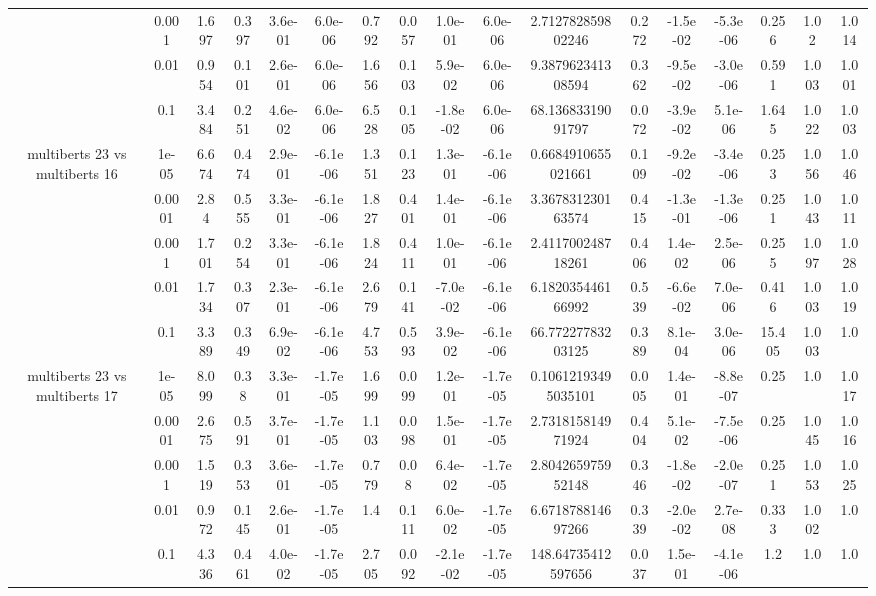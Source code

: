 \begin{tabular}{|c|c|c|c|c|c|c|c|c|c|c|c|c|c|c|c|c|}
 & 0.001 & 1.697 & 0.397 & 3.6e-01 & 6.0e-06 & 0.792 & 0.057 & 1.0e-01 & 6.0e-06 & 2.712782859802246 & 0.272 & -1.5e-02 & -5.3e-06 & 0.256 & 1.02 & 1.014 \\
 & 0.01 & 0.954 & 0.101 & 2.6e-01 & 6.0e-06 & 1.656 & 0.103 & 5.9e-02 & 6.0e-06 & 9.387962341308594 & 0.362 & -9.5e-02 & -3.0e-06 & 0.591 & 1.003 & 1.001 \\
 & 0.1 & 3.484 & 0.251 & 4.6e-02 & 6.0e-06 & 6.528 & 0.105 & -1.8e-02 & 6.0e-06 & 68.13683319091797 & 0.072 & -3.9e-02 & 5.1e-06 & 1.645 & 1.022 & 1.003 \\
\hline
\multirow{5}{*}{multiberts 23 vs multiberts 16} & 1e-05 & 6.674 & 0.474 & 2.9e-01 & -6.1e-06 & 1.351 & 0.123 & 1.3e-01 & -6.1e-06 & 0.6684910655021661 & 0.109 & -9.2e-02 & -3.4e-06 & 0.253 & 1.056 & 1.046 \\
 & 0.0001 & 2.84 & 0.555 & 3.3e-01 & -6.1e-06 & 1.827 & 0.401 & 1.4e-01 & -6.1e-06 & 3.367831230163574 & 0.415 & -1.3e-01 & -1.3e-06 & 0.251 & 1.043 & 1.011 \\
 & 0.001 & 1.701 & 0.254 & 3.3e-01 & -6.1e-06 & 1.824 & 0.411 & 1.0e-01 & -6.1e-06 & 2.411700248718261 & 0.406 & 1.4e-02 & 2.5e-06 & 0.255 & 1.097 & 1.028 \\
 & 0.01 & 1.734 & 0.307 & 2.3e-01 & -6.1e-06 & 2.679 & 0.141 & -7.0e-02 & -6.1e-06 & 6.182035446166992 & 0.539 & -6.6e-02 & 7.0e-06 & 0.416 & 1.003 & 1.019 \\
 & 0.1 & 3.389 & 0.349 & 6.9e-02 & -6.1e-06 & 4.753 & 0.593 & 3.9e-02 & -6.1e-06 & 66.77227783203125 & 0.389 & 8.1e-04 & 3.0e-06 & 15.405 & 1.003 & 1.0 \\
\hline
\multirow{5}{*}{multiberts 23 vs multiberts 17} & 1e-05 & 8.099 & 0.38 & 3.3e-01 & -1.7e-05 & 1.699 & 0.099 & 1.2e-01 & -1.7e-05 & 0.10612193495035101 & 0.005 & 1.4e-01 & -8.8e-07 & 0.25 & 1.0 & 1.017 \\
 & 0.0001 & 2.675 & 0.591 & 3.7e-01 & -1.7e-05 & 1.103 & 0.098 & 1.5e-01 & -1.7e-05 & 2.731815814971924 & 0.404 & 5.1e-02 & -7.5e-06 & 0.25 & 1.045 & 1.016 \\
 & 0.001 & 1.519 & 0.353 & 3.6e-01 & -1.7e-05 & 0.779 & 0.08 & 6.4e-02 & -1.7e-05 & 2.804265975952148 & 0.346 & -1.8e-02 & -2.0e-07 & 0.251 & 1.053 & 1.025 \\
 & 0.01 & 0.972 & 0.145 & 2.6e-01 & -1.7e-05 & 1.4 & 0.111 & 6.0e-02 & -1.7e-05 & 6.671878814697266 & 0.339 & -2.0e-02 & 2.7e-08 & 0.333 & 1.002 & 1.0 \\
 & 0.1 & 4.336 & 0.461 & 4.0e-02 & -1.7e-05 & 2.705 & 0.092 & -2.1e-02 & -1.7e-05 & 148.64735412597656 & 0.037 & 1.5e-01 & -4.1e-06 & 1.2 & 1.0 & 1.0 \\

\end{tabular}
